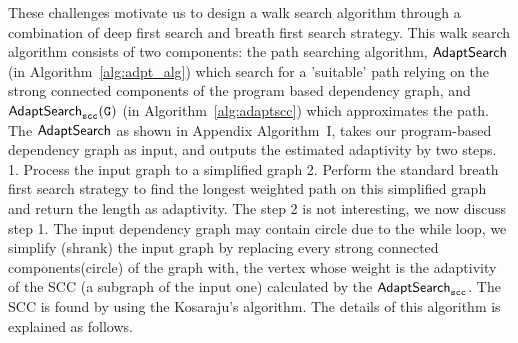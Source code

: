 These challenges motivate us to design a walk search algorithm through a combination of 
deep first search and breath first search strategy. 
This walk search algorithm consists of two components:
the path searching algorithm, $\mathsf{AdaptSearch}$ (in Algorithm~\ref{alg:adpt_alg})
which search for a 'suitable' path relying on the strong connected components of the program based dependency graph, 
and $\mathtt{\mathsf{AdaptSearch}_{scc}(G)}$ (in Algorithm~\ref{alg:adaptscc}) which approximates the
path.
%
The $\mathsf{AdaptSearch}$ as shown in Appendix Algorithm~I, takes our program-based dependency graph as input, and outputs the estimated adaptivity by two steps. 1. Process the input graph to a simplified graph 2. Perform
     the standard breath first search strategy to find the longest weighted path on this simplified graph and return the length as adaptivity.
The step 2 is not interesting, we now discuss step 1. 
The input dependency graph may contain circle due to the while loop, we simplify (shrank) the input graph by replacing every strong connected components(circle) of the graph with, the vertex whose weight is the adaptivity of the SCC 
(a subgraph of the input one) calculated by the $\mathsf{AdaptSearch}_{\mathtt{scc}}$. 
The SCC is found by using the Kosaraju's algorithm.
The details of this algorithm is explained as follows.
